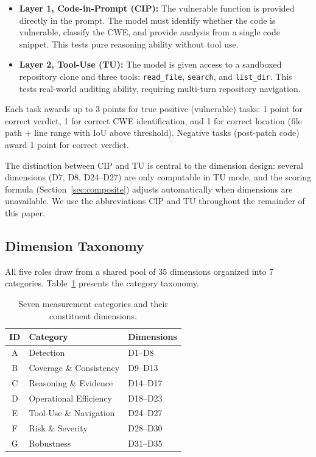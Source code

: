 \documentclass[10pt,twocolumn]{article}
\begin{document}
\begin{itemize}[noitemsep,topsep=2pt]
    \item \textbf{Layer 1, Code-in-Prompt (CIP):} The vulnerable function is provided directly in the prompt. The model must identify whether the code is vulnerable, classify the CWE, and provide analysis from a single code snippet. This tests pure reasoning ability without tool use.
    \item \textbf{Layer 2, Tool-Use (TU):} The model is given access to a sandboxed repository clone and three tools: \texttt{read\_file}, \texttt{search}, and \texttt{list\_dir}. This tests real-world auditing ability, requiring multi-turn repository navigation.
\end{itemize}

Each task awards up to 3 points for true positive (vulnerable) tasks: 1 point for correct verdict, 1 for correct CWE identification, and 1 for correct location (file path + line range with IoU above threshold). Negative tasks (post-patch code) award 1 point for correct verdict.

The distinction between CIP and TU is central to the dimension design: several dimensions (D7, D8, D24--D27) are only computable in TU mode, and the scoring formula (Section~\ref{sec:composite}) adjusts automatically when dimensions are unavailable. We use the abbreviations CIP and TU throughout the remainder of this paper.

\subsection{Dimension Taxonomy}
\label{sec:taxonomy}

All five roles draw from a shared pool of 35 dimensions organized into 7 categories. Table~\ref{tab:categories} presents the category taxonomy.

\begin{table}[t]
\centering
\caption{Seven measurement categories and their constituent dimensions.}
\label{tab:categories}
\small
\begin{tabular}{@{}clp{3.0cm}@{}}
\toprule
\textbf{ID} & \textbf{Category} & \textbf{Dimensions} \\
\midrule
A & Detection & D1--D8 \\
B & Coverage \& Consistency & D9--D13 \\
C & Reasoning \& Evidence & D14--D17 \\
D & Operational Efficiency & D18--D23 \\
E & Tool-Use \& Navigation & D24--D27 \\
F & Risk \& Severity & D28--D30 \\
G & Robustness & D31--D35 \\
\bottomrule
\end{tabular}
\end{table}
\end{document}
